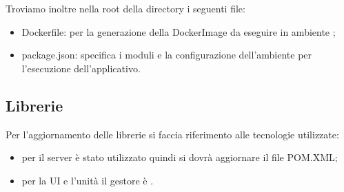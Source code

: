 	Troviamo inoltre nella root della directory i seguenti file:
	\begin{itemize}
		\item{Dockerfile}: per la generazione della DockerImage da eseguire in ambiente ;
		\item{package.json}: specifica i moduli e la configurazione dell'ambiente  per l'esecuzione dell'applicativo.
	\end{itemize}

\subsection{Librerie}
	Per l'aggiornamento delle librerie si faccia riferimento alle tecnologie utilizzate:
	\begin{itemize}
		\item{} per il server è stato utilizzato  quindi si dovrà aggiornare il file POM.XML;
		\item{} per la UI e l'unità il gestore è .
	\end{itemize}
